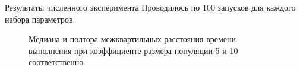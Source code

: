\documentclass{beamer}
\begin{document}
\begin{frame}{Результаты численного эксперимента}
    Проводилось по 100 запусков для каждого набора параметров.
    \begin{figure}
        \caption{Медиана и полтора межквартильных расстояния
            времени выполнения при коэффициенте размера популяции
            5 и 10 соответственно}
    \end{figure}
\end{frame}
\end{document}
